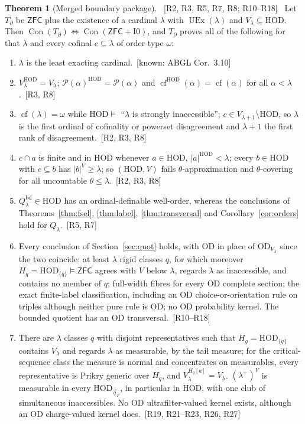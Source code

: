 \documentclass[11pt,letterpaper]{article}
\theoremstyle{definition}
\newtheorem{theorem}[definition]{Theorem}
\numberwithin{equation}{section}
\newcommand{\ZFC}{\mathsf{ZFC}}
\newcommand{\HOD}{\mathrm{HOD}}
\newcommand{\OD}{\mathrm{OD}}
\newcommand{\UEx}{\operatorname{UEx}}
\newcommand{\Con}{\operatorname{Con}}
\newcommand{\cf}{\operatorname{cf}}
\newcommand{\Pow}{\mathcal P}
\newcommand{\Izero}{\mathrm{I0}}
\newcommand{\src}[1]{\unskip\ {\normalfont\small\sffamily\color{Olive}[#1]}\ }
\begin{document}
\begin{theorem}[Merged boundary package]\label{thm:i0}\src{R2, R3, R5, R7, R8; R10--R18}
Let $T_{\partial}$ be $\ZFC$ plus the existence of a cardinal $\lambda$ with $\UEx(\lambda)$ and $V_\lambda\subseteq\HOD$. Then $\Con(T_\partial)\Leftrightarrow\Con(\ZFC+\Izero)$, and $T_\partial$ proves all of the following for that $\lambda$ and every cofinal $c\subseteq\lambda$ of order type $\omega$:
\begin{enumerate}
\item $\lambda$ is the least exacting cardinal.\src{known: ABGL Cor.~3.10}
\item $V^{\HOD}_\lambda=V_\lambda$; $\Pow(\alpha)^{\HOD}=\Pow(\alpha)$ and $\cf^{\HOD}(\alpha)=\cf(\alpha)$ for all $\alpha<\lambda$.\src{R3, R8}
\item $\cf(\lambda)=\omega$ while $\HOD\models$ ``$\lambda$ is strongly inaccessible''; $c\in V_{\lambda+1}\setminus\HOD$, so $\lambda$ is the first ordinal of cofinality or powerset disagreement and $\lambda+1$ the first rank of disagreement.\src{R2, R3, R8}
\item $c\cap a$ is finite and in $\HOD$ whenever $a\in\HOD$, $|a|^{\HOD}<\lambda$; every $b\in\HOD$ with $c\subseteq b$ has $|b|^V\ge\lambda$; so $(\HOD,V)$ fails $\theta$-approximation and $\theta$-covering for all uncountable $\theta\le\lambda$.\src{R2, R3, R8}
\item $Q^{\mathrm{bd}}_\lambda\in\HOD$ has an ordinal-definable well-order, whereas the conclusions of Theorems~\ref{thm:fsel}, \ref{thm:label}, \ref{thm:transversal} and Corollary~\ref{cor:orders} hold for $Q_\lambda$.\src{R5, R7}
\item Every conclusion of Section~\ref{sec:quot} holds, with $\OD$ in place of $\OD_{V_\lambda}$ since the two coincide: at least $\lambda$ rigid classes $q$, for which moreover $H_q=\HOD_{\{q\}}\models\ZFC$ agrees with $V$ below $\lambda$, regards $\lambda$ as inaccessible, and contains no member of $q$; full-width fibres for every $\OD$ complete section; the exact finite-label classification, including an $\OD$ choice-or-orientation rule on triples although neither pure rule is $\OD$; no $\OD$ probability kernel. The bounded quotient has an $\OD$ transversal.\src{R10--R18}
\item There are $\lambda$ classes $q$ with disjoint representatives such that $H_q=\HOD_{\{q\}}$ contains $V_\lambda$ and regards $\lambda$ as measurable, by the tail measure; for the critical-sequence class the measure is normal and concentrates on measurables, every representative is Prikry generic over $H_q$, and $V_\lambda^{H_q[a]}=V_\lambda$. $(\lambda^+)^V$ is measurable in every $\HOD_{\vec q_F}$, in particular in $\HOD$, with one club of simultaneous inaccessibles. No $\OD$ ultrafilter-valued kernel exists, although an $\OD$ charge-valued kernel does.\src{R19, R21--R23, R26, R27}
\end{enumerate}
\end{theorem}
\end{document}
